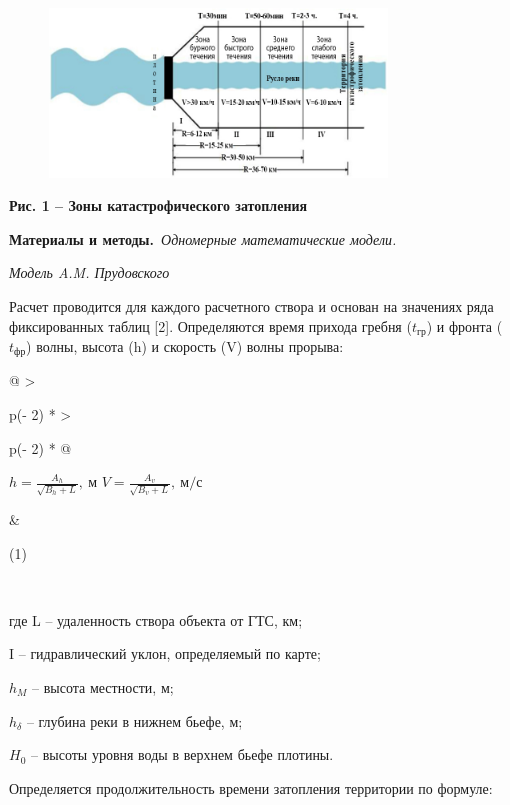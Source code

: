 \begin{figure}[H]
	\centering
	\includegraphics[width=0.8\textwidth]{assets/61}
	\caption*{}
\end{figure}

\textbf{Рис. 1 -- Зоны катастрофического затопления}

\textbf{Материалы и методы.}~\emph{Одномерные математические модели.}

\emph{Модель A.M. Прудовского}

Расчет проводится для каждого расчетного створа и основан на значениях
ряда фиксированных таблиц {[}2{]}. Определяются время прихода гребня
(\(t_{гр}\)) и фронта (\(t_{фр}\)) волны, высота (h) и скорость (V)
волны прорыва:

\begin{longtable}[]{@{}
  >{\raggedright\arraybackslash}p{(\columnwidth - 2\tabcolsep) * }
  >{\raggedright\arraybackslash}p{(\columnwidth - 2\tabcolsep) * }@{}}
\toprule\noalign{}
\begin{minipage}[b]{\linewidth}\raggedright
\(h = \frac{A_{h}}{\sqrt{B_{h} + L}},\ м\)
\(V = \frac{A_{v}}{\sqrt{B_{v} + L}},\ м/с\)
\end{minipage} & \begin{minipage}[b]{\linewidth}\raggedright
(1)
\end{minipage} \\
\midrule\noalign{}
\endhead
\bottomrule\noalign{}
\endlastfoot
\end{longtable}

где L -- удаленность створа объекта от ГТС, км;

I -- гидравлический уклон, определяемый по карте;

\(h_{M}\) -- высота местности, м;

\(h_{\delta}\) -- глубина реки в нижнем бьефе, м;

\(H_{0}\) -- высоты уровня воды в верхнем бьефе плотины.

Определяется продолжительность времени затопления территории по формуле:

